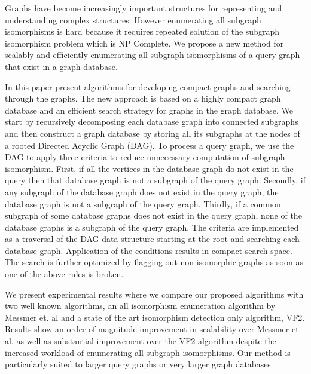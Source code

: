 
Graphs have become increasingly important structures for representing and understanding complex structures. However enumerating all subgraph isomorphisms is hard because it requires repeated solution of the subgraph isomorphism problem which is NP Complete.
We propose a new method for scalably and efficiently 
enumerating all subgraph isomorphisms of a query graph that exist in a graph database. 

In this paper present algorithms for developing compact graphs and searching through the graphs.
The new approach is based on a highly compact graph database and an efficient search strategy for graphs in the graph database. We start by recursively decomposing each database graph into connected subgraphs and then construct a graph database by storing all its subgraphs at the nodes of a rooted Directed Acyclic Graph (DAG). To process a query graph, we use the DAG to apply three criteria to reduce unnecessary computation of subgraph isomorphism. First, if all the vertices in the database graph do not exist in the query then that database graph is not a subgraph of the query graph. Secondly, if any subgraph of the database graph does not exist in the query graph, the database graph is not a subgraph of the query graph. Thirdly, if a common subgraph of some database graphs does not exist in the query graph, none of the database graphs is a subgraph of the query graph. The criteria are implemented as a traversal of the DAG data structure starting at the root and searching each database graph. Application of the conditions results in compact search space. The search is further optimized by flagging out non-isomorphic graphs as soon as one of the above rules is broken. 

We present experimental results where we compare our proposed algorithms with two well known algorithms, an all isomorphism enumeration algorithm by Messmer et. al and a state of the art isomorphism detection only algorithm, VF2. Results show an order of magnitude improvement in scalability over Messmer et. al. as well as substantial improvement over the VF2 algorithm despite the increased workload of enumerating all subgraph isomorphisms. Our method is particularly suited to larger query graphs or very larger graph databases
